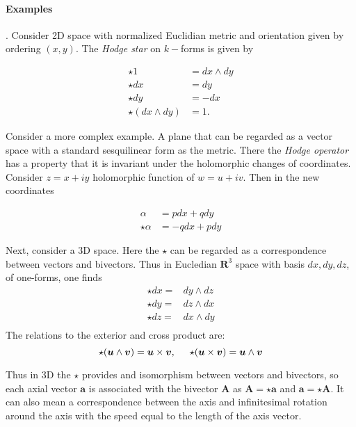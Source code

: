 \paragraph{Examples}.
Consider 2D space with normalized Euclidian metric and orientation given by ordering $(x,y)$. The \textit{Hodge star} on $k-$forms is given by 

\begin{align}
\star 1 &= dx \wedge dy \\
\star dx &= dy \\
\star dy &= -dx \\
\star(dx \wedge dy) &= 1.
\end{align}

Consider a more complex example. A plane that can be regarded as a vector space with a standard sesquilinear form as the metric. 
There the \textit{Hodge operator} has a property that it is invariant under the holomorphic changes of coordinates. 
Consider $z = x + iy$ holomorphic function of $w=u + iv$. Then in the new coordinates 

\begin{align}
\alpha &= pdx +qdy \\
\star \alpha &= -q dx + p dy
\end{align}

Next, consider a 3D space. 
Here the $\star$ can be regarded as a correspondence between vectors and bivectors. 
Thus in Eucledian $\boldsymbol{R}^3$ space with basis $dx,dy,dz$, of one-forms, one finds
\begin{align}
\star dx =& dy\wedge dz \\
\star dy =& dz\wedge dx \\
\star dz =& dx \wedge dy \\
\end{align}
The relations to the exterior and cross product are:
\begin{equation}
\star(\boldsymbol{u}\wedge\boldsymbol{v})=\boldsymbol{u}\times\boldsymbol{v}, \hspace{5mm}\star(\boldsymbol{u}\times\boldsymbol{v}) = \boldsymbol{u}\wedge\boldsymbol{v}
\end{equation}

Thus in 3D the $\star$ provides and isomorphism between vectors and bivectors, so each axial vector $\boldsymbol{a}$ is associated with the bivector $\boldsymbol{A}$ as $\boldsymbol{A} = \star\boldsymbol{a}$ and $\boldsymbol{a} = \star\boldsymbol{A}$. It can also mean a correspondence between the axis and infinitesimal rotation around the axis with the speed equal to the length of the axis vector.


